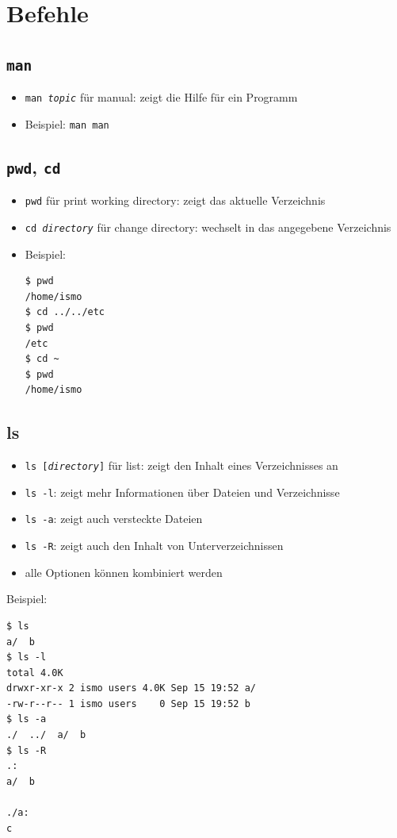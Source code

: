 \section{Befehle}
\subsection{\texttt{man}}
\begin{itemize}
  \item \texttt{man \textit{topic}} für manual: zeigt die Hilfe für ein Programm
  \item Beispiel: \texttt{man man}
\end{itemize}

\subsection{\texttt{pwd}, \texttt{cd}}
\begin{itemize}
  \item \texttt{pwd} für print working directory: zeigt das aktuelle Verzeichnis
  \item \texttt{cd \textit{directory}} für change directory: wechselt in das angegebene Verzeichnis
  \item Beispiel:
\begin{verbatim}
$ pwd
/home/ismo
$ cd ../../etc
$ pwd
/etc
$ cd ~
$ pwd
/home/ismo
\end{verbatim}
\end{itemize}

\subsection{ls}
\begin{itemize}
  \item \texttt{ls [\textit{directory}]} für list: zeigt den Inhalt eines Verzeichnisses an
  \item \texttt{ls -l}: zeigt mehr Informationen über Dateien und Verzeichnisse
  \item \texttt{ls -a}: zeigt auch versteckte Dateien
  \item \texttt{ls -R}: zeigt auch den Inhalt von Unterverzeichnissen
  \item alle Optionen können kombiniert werden
\end{itemize}
Beispiel:
\begin{verbatim}
$ ls
a/  b
$ ls -l
total 4.0K
drwxr-xr-x 2 ismo users 4.0K Sep 15 19:52 a/
-rw-r--r-- 1 ismo users    0 Sep 15 19:52 b
$ ls -a
./  ../  a/  b
$ ls -R
.:
a/  b

./a:
c
\end{verbatim}

